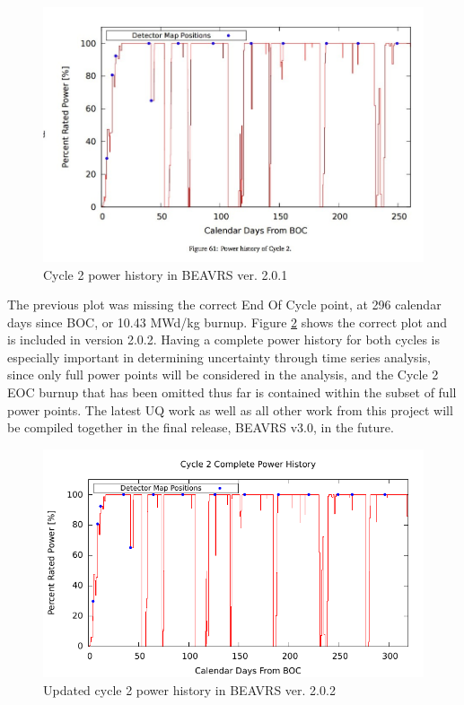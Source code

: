 \documentclass{article}
\begin{document}
\begin{figure}[!htb]
\centering
\includegraphics[width = 4.5 in]{figures/cyc2_pow_his_old}
\caption{Cycle 2 power history in BEAVRS ver. 2.0.1}
\label{fig:cyc2powhist}
\end{figure}

The previous plot was missing the correct End Of Cycle point, at 296 calendar days since BOC, or 10.43 MWd/kg burnup. Figure \ref{fig:cyc2powhist_new} shows the correct plot and is included in version 2.0.2. Having a complete power history for both cycles is especially important in determining uncertainty through time series analysis, since only full power points will be considered in the analysis, and the Cycle 2 EOC burnup that has been omitted thus far is contained within the subset of full power points. The latest UQ work as well as all other work from this project will be compiled together in the final release, BEAVRS v3.0, in the future.

\begin{figure}[!htb]
\centering
\includegraphics[width = 4.5 in]{figures/cyc2_pow_his_new}
\caption{Updated cycle 2 power history in BEAVRS ver. 2.0.2}
\label{fig:cyc2powhist_new}
\end{figure}
\end{document}
